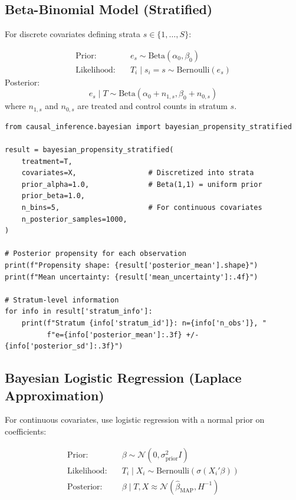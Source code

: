 \subsection{Beta-Binomial Model (Stratified)}

For discrete covariates defining strata $s \in \{1, \ldots, S\}$:

\begin{proposition}
\begin{align}
\text{Prior:} \quad & e_s \sim \text{Beta}(\alpha_0, \beta_0) \\
\text{Likelihood:} \quad & T_i \mid s_i = s \sim \text{Bernoulli}(e_s)
\end{align}
Posterior:
\begin{equation}
e_s \mid T \sim \text{Beta}(\alpha_0 + n_{1,s}, \beta_0 + n_{0,s})
\end{equation}
where $n_{1,s}$ and $n_{0,s}$ are treated and control counts in stratum $s$.
\end{proposition}

\begin{verbatim}
from causal_inference.bayesian import bayesian_propensity_stratified

result = bayesian_propensity_stratified(
    treatment=T,
    covariates=X,                 # Discretized into strata
    prior_alpha=1.0,              # Beta(1,1) = uniform prior
    prior_beta=1.0,
    n_bins=5,                     # For continuous covariates
    n_posterior_samples=1000,
)

# Posterior propensity for each observation
print(f"Propensity shape: {result['posterior_mean'].shape}")
print(f"Mean uncertainty: {result['mean_uncertainty']:.4f}")

# Stratum-level information
for info in result['stratum_info']:
    print(f"Stratum {info['stratum_id']}: n={info['n_obs']}, "
          f"e={info['posterior_mean']:.3f} +/- {info['posterior_sd']:.3f}")
\end{verbatim}

\subsection{Bayesian Logistic Regression (Laplace Approximation)}

For continuous covariates, use logistic regression with a normal prior on coefficients:

\begin{align}
\text{Prior:} \quad & \beta \sim \mathcal{N}(0, \sigma_{\text{prior}}^2 I) \\
\text{Likelihood:} \quad & T_i \mid X_i \sim \text{Bernoulli}(\sigma(X_i' \beta)) \\
\text{Posterior:} \quad & \beta \mid T, X \approx \mathcal{N}(\hat{\beta}_{\text{MAP}}, H^{-1})
\end{align}

